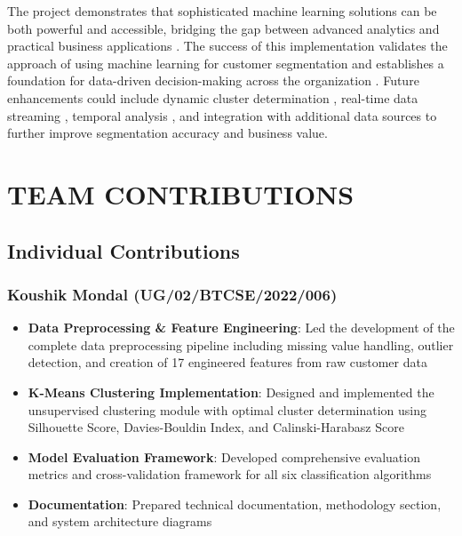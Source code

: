\documentclass[12pt,a4paper]{report}
\begin{document}
\noindent The project demonstrates that sophisticated machine learning solutions can be both powerful and accessible, bridging the gap between advanced analytics and practical business applications \cite{kumar2006}. The success of this implementation validates the approach of using machine learning for customer segmentation and establishes a foundation for data-driven decision-making across the organization \cite{wedel2000market}. Future enhancements could include dynamic cluster determination \cite{monti2003}, real-time data streaming \cite{armbrust2010}, temporal analysis \cite{neslin2006}, and integration with additional data sources to further improve segmentation accuracy and business value.


\chapter*{TEAM CONTRIBUTIONS}

\section*{Individual Contributions}

\subsection*{Koushik Mondal (UG/02/BTCSE/2022/006)}
\begin{itemize}
    \item \textbf{Data Preprocessing \& Feature Engineering}: Led the development of the complete data preprocessing pipeline including missing value handling, outlier detection, and creation of 17 engineered features from raw customer data
    \item \textbf{K-Means Clustering Implementation}: Designed and implemented the unsupervised clustering module with optimal cluster determination using Silhouette Score, Davies-Bouldin Index, and Calinski-Harabasz Score
    \item \textbf{Model Evaluation Framework}: Developed comprehensive evaluation metrics and cross-validation framework for all six classification algorithms
    \item \textbf{Documentation}: Prepared technical documentation, methodology section, and system architecture diagrams
\end{itemize}
\end{document}
